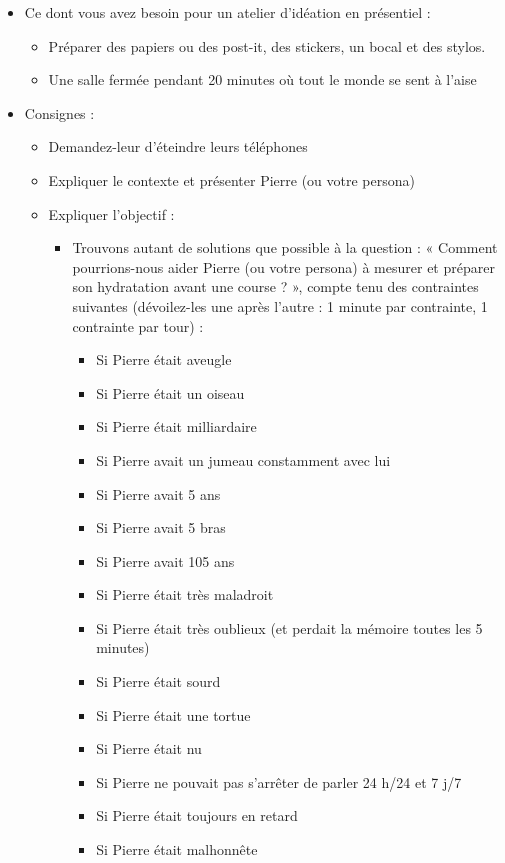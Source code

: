 \begin{itemize}
\item Ce dont vous avez besoin pour un atelier d'idéation en présentiel :
\begin{itemize}
\item Préparer des papiers ou des post-it, des stickers, un bocal et des stylos.
\item Une salle fermée pendant 20 minutes où tout le monde se sent à l'aise
\end{itemize}
\item Consignes :
\begin{itemize}
\item Demandez-leur d'éteindre leurs téléphones
\item Expliquer le contexte et présenter Pierre (ou votre persona)
\item Expliquer l'objectif :
\begin{itemize}
\item Trouvons autant de solutions que possible à la question : « Comment pourrions-nous aider Pierre (ou votre persona) à mesurer et préparer son hydratation avant une course ? », compte tenu des contraintes suivantes (dévoilez-les une après l'autre : 1 minute par contrainte, 1 contrainte par tour) :
\begin{itemize}
\item Si Pierre était aveugle
\item Si Pierre était un oiseau
\item Si Pierre était milliardaire
\item Si Pierre avait un jumeau constamment avec lui
\item Si Pierre avait 5 ans
\item Si Pierre avait 5 bras
\item Si Pierre avait 105 ans
\item Si Pierre était très maladroit
\item Si Pierre était très oublieux (et perdait la mémoire toutes les 5 minutes)
\item Si Pierre était sourd
\item Si Pierre était une tortue
\item Si Pierre était nu
\item Si Pierre ne pouvait pas s'arrêter de parler 24 h/24 et 7 j/7
\item Si Pierre était toujours en retard
\item Si Pierre était malhonnête
\end{itemize}
\end{itemize}

\end{itemize}
\end{itemize}
